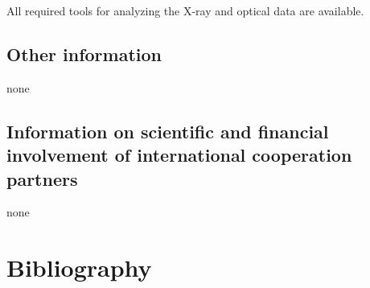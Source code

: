 \documentclass[10pt,fleqn,twoside,a4paper]{article}
\begin{document}
All required tools for analyzing the X-ray and optical data are available.

\subsection{Other information}
\vspace{-2mm}

none
\vspace{-2mm}

\subsection{Information on scientific and financial involvement of international cooperation partners}
\vspace{-2mm}

none
\vspace{-2mm}

\section{Bibliography}
\vspace{-2mm}



\end{document}
